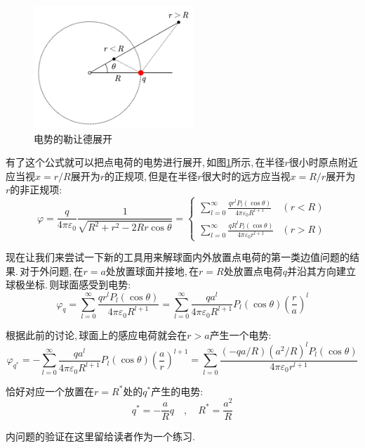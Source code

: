 \begin{figure}
	\vspace{-0.6cm}
	\centering
	\includegraphics[width=6cm]{image/7-2-15.png}
	\caption{电势的勒让德展开}\label{fig:7-2-15}
\end{figure}
有了这个公式就可以把点电荷的电势进行展开,\,如图\ref{fig:7-2-15}所示,\,在半径$r$很小时原点附近应当视$x=r/R$展开为$r$的正规项,\,但是在半径$r$很大时的远方应当视$x=R/r$展开为$r$的非正规项:
\[\varphi=\frac{q}{4\pi\varepsilon_0}\frac{1}{\sqrt{R^2+r^2-2Rr\cos\theta}}=\begin{cases}
\displaystyle\sum_{l=0}^\infty \frac{qr^lP_l(\cos\theta)}{4\pi\varepsilon_0R^{l+1}}&(r<R)\\
\displaystyle\sum_{l=0}^\infty \frac{qR^lP_l(\cos\theta)}{4\pi\varepsilon_0r^{l+1}}&(r>R)
\end{cases}\]

\vspace{0.5cm}
现在让我们来尝试一下新的工具用来解球面内外放置点电荷的第一类边值问题的结果.\,对于外问题,\,在$r=a$处放置球面并接地,\,在$r=R$处放置点电荷$q$并沿其方向建立球极坐标.\,则球面感受到电势:
\[\varphi_q=\sum_{l=0}^\infty \frac{qr^lP_l(\cos\theta)}{4\pi\varepsilon_0R^{l+1}}=\sum_{l=0}^\infty \frac{qa^l}{4\pi\varepsilon_0R^{l+1}}P_l(\cos\theta)\left(\frac{r}{a}\right)^l\]

根据此前的讨论,\,球面上的感应电荷就会在$r>a$产生一个电势:
\[\varphi_{q^*}=-\sum_{l=0}^\infty \frac{qa^l}{4\pi\varepsilon_0R^{l+1}}P_l(\cos\theta)\left(\frac{a}{r}\right)^{l+1}=\sum_{l=0}^\infty \frac{(-qa/R)(a^2/R)^lP_l(\cos\theta)}{4\pi\varepsilon_0r^{l+1}}\]

恰好对应一个放置在$r=R^*$处的$q^*$产生的电势:
\[q^*=-\frac{a}{R}q\quad ,\quad R^*=\frac{a^2}{R}\]

内问题的验证在这里留给读者作为一个练习.

